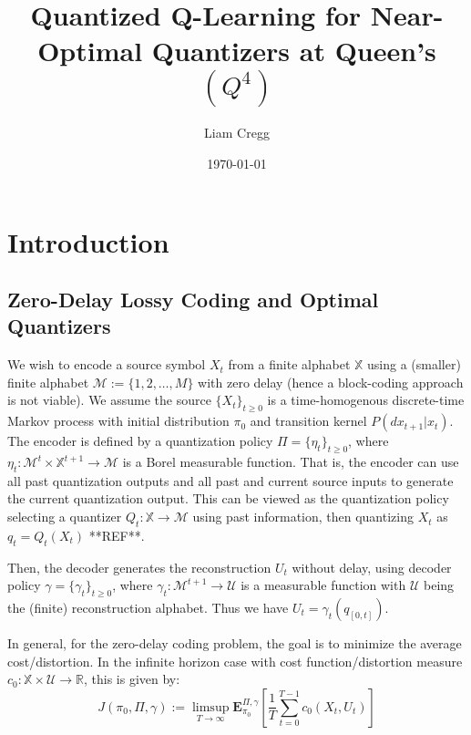 \documentclass{article}
\title{Quantized Q-Learning for Near-Optimal Quantizers at Queen's \((Q^4)\)}
\date{\today}
\author{Liam Cregg}
\begin{document}
\begin{titlepage}
    \maketitle
\end{titlepage}

\newpage

\section{Introduction}
\subsection{Zero-Delay Lossy Coding and Optimal Quantizers}\label{optimal quantizers}
We wish to encode a source symbol \( X_t \) from a finite alphabet \( \mathbb{X} \) using a (smaller) finite alphabet \( \mathcal{M} := \{1, 2, \ldots, M\} \) with zero delay (hence a block-coding approach is not viable). We assume the source \( \{X_t\}_{t \ge 0} \) is a time-homogenous discrete-time Markov process with initial distribution \( \pi_0 \) and transition kernel \( P(dx_{t+1} | x_t) \). The encoder is defined by a quantization policy \( \Pi = \{\eta_t\}_{t \ge 0} \), where \( \eta_t : \mathcal{M}^t \times \mathbb{X}^{t+1} \to \mathcal{M} \) is a Borel measurable function. That is, the encoder can use all past quantization outputs and all past and current source inputs to generate the current quantization output. This can be viewed as the quantization policy selecting a quantizer \( Q_t : \mathbb{X} \to \mathcal{M} \) using past information, then quantizing \( X_t \) as \( q_t = Q_t(X_t) \) **REF**. %

Then, the decoder generates the reconstruction \( U_t \) without delay, using decoder policy \( \gamma = \{\gamma_t\}_{t \ge 0} \), where \( \gamma_t : \mathcal{M}^{t+1} \to \mathcal{U} \) is a measurable function with \( \mathcal{U} \) being the (finite) reconstruction alphabet. Thus we have \( U_t = \gamma_t(q_{[0,t]}) \). %

In general, for the zero-delay coding problem, the goal is to minimize the average cost/distortion. In the infinite horizon case with cost function/distortion measure \( c_0 : \mathbb{X} \times \mathcal{U} \to \mathbb{R} \), this is given by:
\[ J(\pi_0, \Pi, \gamma) := \limsup_{T\to\infty}\mathbf{E}_{\pi_0}^{\Pi, \gamma}\left[\frac{1}{T}\sum_{t=0}^{T-1}c_0(X_t,U_t)\right] \]
\end{document}
